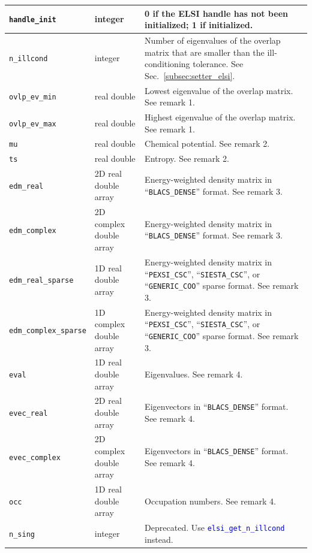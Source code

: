 \documentclass{report}
\newcommand{\api}[1]{\textcolor{blue}{\texttt{#1}}}
\begin{document}
\begin{longtable}[]{|p{35mm}|p{40mm}|p{87mm}|}
\hline
\texttt{handle\_init}         & integer                 & 0 if the ELSI handle has not been initialized; 1 if initialized.\\
\hline
\texttt{n\_illcond}           & integer                 & Number of eigenvalues of the overlap matrix that are smaller than the ill-conditioning tolerance. See Sec.~\ref{subsec:setter_elsi}.\\
\hline
\texttt{ovlp\_ev\_min}        & real double             & Lowest eigenvalue of the overlap matrix. See remark 1.\\
\hline
\texttt{ovlp\_ev\_max}        & real double             & Highest eigenvalue of the overlap matrix. See remark 1.\\
\hline
\texttt{mu}                   & real double             & Chemical potential. See remark 2.\\
\hline
\texttt{ts}                   & real double             & Entropy. See remark 2.\\
\hline
\texttt{edm\_real}            & 2D real double array    & Energy-weighted density matrix in ``\texttt{BLACS\_DENSE}'' format. See remark 3.\\
\hline
\texttt{edm\_complex}         & 2D complex double array & Energy-weighted density matrix in ``\texttt{BLACS\_DENSE}'' format. See remark 3.\\
\hline
\texttt{edm\_real\_sparse}    & 1D real double array    & Energy-weighted density matrix in ``\texttt{PEXSI\_CSC}'', ``\texttt{SIESTA\_CSC}'', or ``\texttt{GENERIC\_COO}'' sparse format. See remark 3.\\
\hline
\texttt{edm\_complex\_sparse} & 1D complex double array & Energy-weighted density matrix in ``\texttt{PEXSI\_CSC}'', ``\texttt{SIESTA\_CSC}'', or ``\texttt{GENERIC\_COO}'' sparse format. See remark 3.\\
\hline
\texttt{eval}                 & 1D real double array    & Eigenvalues. See remark 4.\\
\hline
\texttt{evec\_real}           & 2D real double array    & Eigenvectors in ``\texttt{BLACS\_DENSE}'' format. See remark 4.\\
\hline
\texttt{evec\_complex}        & 2D complex double array & Eigenvectors in ``\texttt{BLACS\_DENSE}'' format. See remark 4.\\
\hline
\texttt{occ}                  & 1D real double array    & Occupation numbers. See remark 4.\\
\hline
\texttt{n\_sing}              & integer                 & Deprecated. Use \api{elsi\_get\_n\_illcond} instead.\\
\hline
\end{longtable}
\end{document}
